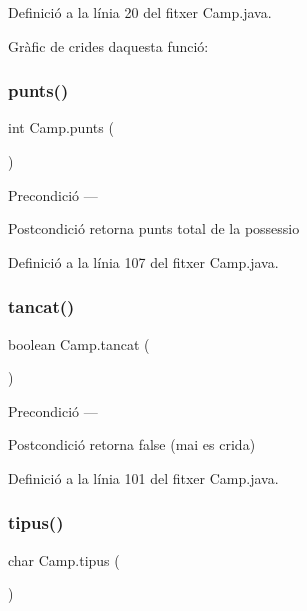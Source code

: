 Definició a la línia 20 del fitxer Camp.\+java.

Gràfic de crides d\textquotesingle{}aquesta funció\+:
\mbox{\label{class_camp_a22023a3a842b831b8b44db10a69afbd7}} 
\subsubsection{\texorpdfstring{punts()}{punts()}\hspace{0.1cm}{\footnotesize\ttfamily [2/2]}}
{\footnotesize\ttfamily int Camp.\+punts (\begin{DoxyParamCaption}{ }\end{DoxyParamCaption})}

\begin{DoxyPrecond}{Precondició}
--- 
\end{DoxyPrecond}
\begin{DoxyPostcond}{Postcondició}
retorna punts total de la possessio 
\end{DoxyPostcond}


Definició a la línia 107 del fitxer Camp.\+java.

\mbox{\label{class_camp_a8a3acd8770255a775e505ce1bcb64856}} 
\subsubsection{\texorpdfstring{tancat()}{tancat()}}
{\footnotesize\ttfamily boolean Camp.\+tancat (\begin{DoxyParamCaption}{ }\end{DoxyParamCaption})}

\begin{DoxyPrecond}{Precondició}
--- 
\end{DoxyPrecond}
\begin{DoxyPostcond}{Postcondició}
retorna false (mai es crida) 
\end{DoxyPostcond}


Definició a la línia 101 del fitxer Camp.\+java.

\mbox{\label{class_camp_aff9badaa78f13e44821cf267de34f03f}} 
\subsubsection{\texorpdfstring{tipus()}{tipus()}}
{\footnotesize\ttfamily char Camp.\+tipus (\begin{DoxyParamCaption}{ }\end{DoxyParamCaption})}

